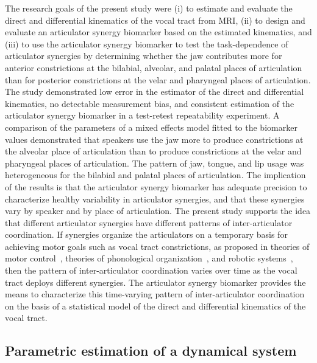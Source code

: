 \documentclass[reprint]{JASAnew}\usepackage[]{graphicx}\usepackage[]{color}
\begin{document}
The research goals of the present study were (i) to estimate and evaluate the direct and differential kinematics of the vocal tract from MRI, 
%
(ii) to design and evaluate an articulator synergy biomarker based on the estimated kinematics, and
%
(iii) to use the articulator synergy biomarker to test the task-dependence of articulator synergies by determining whether the jaw contributes more for anterior constrictions at the bilabial, alveolar, and palatal places of articulation than for posterior constrictions at the velar and pharyngeal places of articulation.
%
The study demonstrated low error in the estimator of the direct and differential kinematics, no detectable measurement bias, and consistent estimation of the articulator synergy biomarker in a test-retest repeatability experiment.
%
A comparison of the parameters of a mixed effects model fitted to the biomarker values demonstrated that speakers use the jaw more to produce constrictions at the alveolar place of articulation than to produce constrictions at the velar and pharyngeal places of articulation. 
%
The pattern of jaw, tongue, and lip usage was heterogeneous for the bilabial and palatal places of articulation.
%
The implication of the results is that the articulator synergy biomarker has adequate precision to characterize healthy variability in articulator synergies, and that these synergies vary by speaker and by place of articulation. 
%
The present study supports the idea that different articulator synergies have different patterns of inter-articulator coordination. 
If synergies organize the articulators on a temporary basis for achieving motor goals such as vocal tract constrictions, as proposed in theories of motor control~\citep{turvey1977preliminaries, saltzman1987skilled}, theories of phonological organization~\citep{browman1986towards, browman1989articulatory}, and robotic systems~\citep{herbort2010sure}, then the pattern of inter-articulator coordination varies over time as the vocal tract deploys different synergies. 
The articulator synergy biomarker provides the means to characterize this time-varying pattern of inter-articulator coordination on the basis of a statistical model of the direct and differential kinematics of the vocal tract. 



\subsection{Parametric estimation of a dynamical system}
\end{document}
